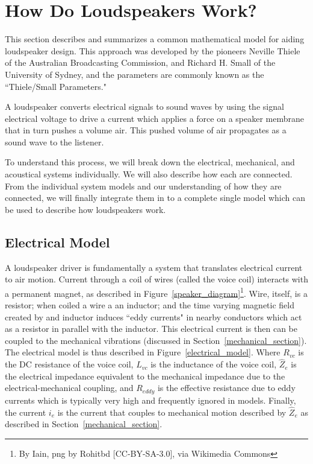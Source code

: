 \documentclass[10pt]{book}
\begin{document}

\chapter{How Do Loudspeakers Work?}\label{loudspeakers}
This section describes and summarizes a common mathematical model for aiding loudspeaker design. This approach was developed by the pioneers Neville Thiele of the Australian Broadcasting Commission, and Richard H. Small of the University of Sydney, and the parameters are commonly known as the ``Thiele/Small Parameters."

A loudspeaker converts electrical signals to sound waves by using the signal electrical voltage to drive a current which applies a force on a speaker membrane that in turn pushes a volume air. This pushed volume of air propagates as a sound wave to the listener.

To understand this process, we will break down the electrical, mechanical, and acoustical systems individually. We will also describe how each are connected. From the individual system models and our understanding of how they are connected, we will finally integrate them in to a complete single model which can be used to describe how loudspeakers work.
\section{Electrical Model}
A loudspeaker driver is fundamentally a system that translates electrical current to air motion. Current through a coil of wires (called the voice coil) interacts with a permanent magnet, as described in Figure~\ref{speaker_diagram}\footnote{By Iain, png by Rohitbd [CC-BY-SA-3.0], via Wikimedia Commons}. Wire, itself, is a resistor; when coiled a wire a an inductor; and the time varying magnetic field created by and inductor induces ``eddy currents" in nearby conductors which act as a resistor in parallel with the inductor. This electrical current is then can be coupled to the mechanical vibrations (discussed in Section~\ref{mechanical_section}). The electrical model is thus described in Figure~\ref{electrical_model}. Where $R_{vc}$ is the DC resistance of the voice coil, $L_{vc}$ is the inductance of the voice coil, $\hat{Z}_e$ is the electrical impedance equivalent to the mechanical impedance due to the electrical-mechanical coupling, and $R_{eddy}$ is the effective resistance due to eddy currents which is typically very high and frequently ignored in models. Finally, the current $i_e$ is the current that couples to mechanical motion described by $\hat{Z}_e$ as described in Section~\ref{mechanical_section}.
\end{document}

